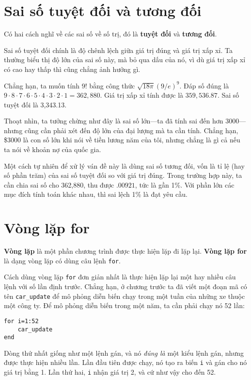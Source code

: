 \documentclass[12pt]{book}
\begin{document}
\section{Sai số tuyệt đối và tương đối}

Có hai cách nghĩ về các sai số về số trị, đó là {\bf tuyệt đối}
và {\bf tương đối}.

Sai số tuyệt đối chính là độ chênh lệch giữa giá trị đúng và giá trị 
xấp xỉ. Ta thường biểu thị độ lớn của sai số này, mà bỏ qua dấu
của nó, vì dù giá trị xấp xỉ có cao hay thấp thì cũng chẳng ảnh
hưởng gì.

Chẳng hạn, ta muốn tính $9!$ bằng công thức $\sqrt
{18 \pi} ( 9 / e)^9$.  Đáp số đúng là $9 \cdot 8 \cdot 7 \cdot 6
\cdot 5 \cdot 4 \cdot 3 \cdot 2 \cdot 1 = 362,880$.  Giá trị xấp xỉ
tính được là $359,536.87$. Sai số tuyệt đối là 3,343.13.

Thoạt nhìn, ta tưởng chừng như đây là sai số lớn---ta đã 
tính sai đến hơn 3000---nhưng cũng cần phải xét đến độ lớn
của đại lượng mà ta cần tính. Chẳng hạn, \$3000 là con số lớn
khi nói về tiền lương năm của tôi, nhưng chẳng là gì cả nếu
ta nói về khoản nợ của quốc gia.

Một cách tự nhiên để xử lý ván đề này là dùng sai số tương đối,
vốn là tỉ lệ (hay số phần trăm) của sai số tuyệt đối so với 
giá trị đúng. Trong trường hợp này, ta cần chia sai số cho
362,880, thu được $.00921$, tức là gần 1\%. Với phần lớn
các mục đích tính toán khác nhau, thì sai lệch 1\% là đạt yêu cầu.


\section{Vòng lặp for}

{\bf Vòng lặp} là một phần chương trình được thực hiện lặp đi
lặp lại. {\bf Vòng lặp for} là dạng vòng lặp có dùng câu lệnh {\tt for}.

Cách dùng vòng lặp {\tt for} đơn giản nhất là thực hiện lặp lại
một hay nhiều câu lệnh với số lần định trước. Chẳng hạn, ở chương
trước ta đã viết một đoạn mã có tên \verb#car_update# để 
mô phỏng diễn biến chạy trong một tuần của những xe thuộc
một công ty. Để mô phỏng diễn biến trong một năm, ta cần phải
chạy nó 52 lần:

\begin{verbatim}
for i=1:52
    car_update
end
\end{verbatim}
%
Dòng thứ nhất giống như một lệnh gán, và nó {\em đúng là} một
kiểu lệnh gán, nhưng được thực hiện nhiều lần. Lần đầu tiên được
chạy, nó tạo ra biến {\tt i} và gán cho nó giá trị bằng 1. Lần thứ hai,
{\tt i} nhận giá trị 2, và cứ như vậy cho đến 52.
\end{document}
